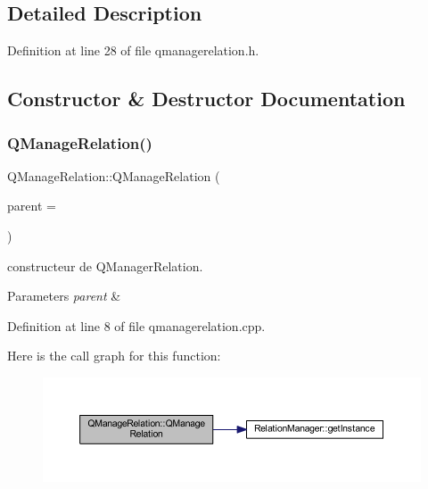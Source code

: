 \subsection{Detailed Description}


Definition at line 28 of file qmanagerelation.\+h.



\subsection{Constructor \& Destructor Documentation}
\mbox{\label{class_q_manage_relation_af470c7a01389927cd834432d4d37f5c9}} 
\subsubsection{\texorpdfstring{Q\+Manage\+Relation()}{QManageRelation()}}
{\footnotesize\ttfamily Q\+Manage\+Relation\+::\+Q\+Manage\+Relation (\begin{DoxyParamCaption}\item[{Q\+Widget $\ast$}]{parent = {} }\end{DoxyParamCaption})\hspace{0.3cm}{\ttfamily [explicit]}}



constructeur de Q\+Manager\+Relation. 


\begin{DoxyParams}{Parameters}
{\em parent} & \\
\hline
\end{DoxyParams}


Definition at line 8 of file qmanagerelation.\+cpp.

Here is the call graph for this function\+:\nopagebreak
\begin{figure}[H]
\begin{center}
\leavevmode
\includegraphics[width=350pt]{class_q_manage_relation_af470c7a01389927cd834432d4d37f5c9_cgraph}
\end{center}
\end{figure}


